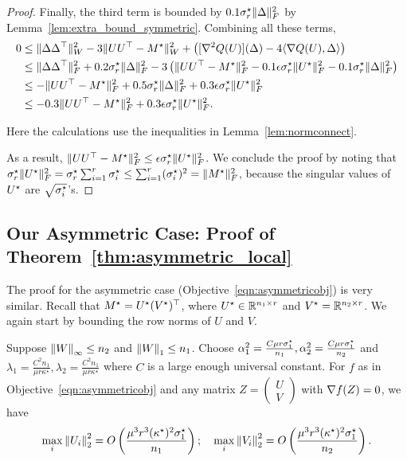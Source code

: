 \begin{proof}
Finally, the third term is bounded by $0.1\sigma^\star_r\|\Delta\|_F^2$ by Lemma~\ref{lem:extra_bound_symmetric}. Combining all these terms,
\begin{align*}
0 & \le \|\Delta\Delta^\top\|_W^2 - 3\|UU^\top - M^\star\|_W^2 + \left([\nabla^2 Q(U)](\Delta) - 4\langle \nabla Q(U), \Delta\rangle\right) \\
& \le \|\Delta\Delta^\top\|_F^2 + 0.2\sigma^\star_r \|\Delta\|_F^2 - 3\left(\|UU^\top - M^\star\|_F^2 - 0.1 \epsilon\sigma^\star_r \|U^\star\|_F^2 -0.1\sigma^\star_r \|\Delta\|_F^2\right)  \\
& \le -\|UU^\top - M^\star\|_F^2 + 0.5 \sigma^\star_r\|\Delta\|_F^2 + 0.3\epsilon \sigma^\star_r \|U^\star\|_F^2 \\
& \le -0.3\|UU^\top - M^\star\|_F^2 + 0.3 \epsilon\sigma^\star_r \|U^\star\|_F^2.
\end{align*}

Here the calculations use the inequalities in Lemma~\ref{lem:normconnect}. 

As a result, $\|UU^\top - M^\star\|_F^2 \le \epsilon \sigma^\star_r \|U^\star\|_F^2$.
We conclude the proof by noting that $\sigma^\star_r \|U^\star\|_F^2 = \sigma^\star_r \sum_{i=1}^r \sigma^\star_i \le \sum_{i=1}^r (\sigma^\star_i)^2 = \|M^\star\|_F^2$, because the singular values of $U^\star$ are $\sqrt{\sigma^\star_i}$'s.
\end{proof}

\subsection{Our Asymmetric Case: Proof of Theorem~\ref{thm:asymmetric_local}}
\label{app:matrix-asymmetric}

The proof for the asymmetric case (Objective~\eqref{eqn:asymmetricobj}) is very similar.
Recall that $M^\star = U^\star(V^\star)^\top$, where $U^\star \in \mathbb{R}^{n_1\times r}$ and $V^\star = \mathbb{R}^{n_2\times r}$.
We again start by bounding the row norms of $U$ and $V$.

\begin{lemma} \label{lem:asymmetricnormbound}
Suppose ${\lVert W{\rVert}}_\infty \le n_2$ and ${\lVert W{\rVert}}_1 \le n_1$. Choose $\alpha_1^2 = \frac{C\mu r\sigma^\star_1}{n_1},\alpha_2^2 = \frac{C\mu r\sigma^\star_1}{n_2}$ and $\lambda_1 = \frac{C^2 n_1}{\mu r\kappa^\star},\lambda_2 = \frac{C^2 n_1}{\mu r\kappa^\star}$ where $C$ is a large enough universal constant. For $f$ as in Objective~\eqref{eqn:asymmetricobj} and any matrix $Z = \begin{pmatrix}
U \\ V
\end{pmatrix}$ with $\nabla f(Z) = 0$, we have
\begin{equation*}
\max_{i}{\lVert U_i{\rVert}}_2^2 = O\left(\frac{\mu^3 r^3 (\kappa^\star)^2 \sigma^\star_1}{n_1}\right); \quad 
\max_{i}{\lVert V_i{\rVert}}_2^2 = O\left(\frac{\mu^3 r^3 (\kappa^\star)^2 \sigma^\star_1}{n_2}\right).
\end{equation*}
\end{lemma}

